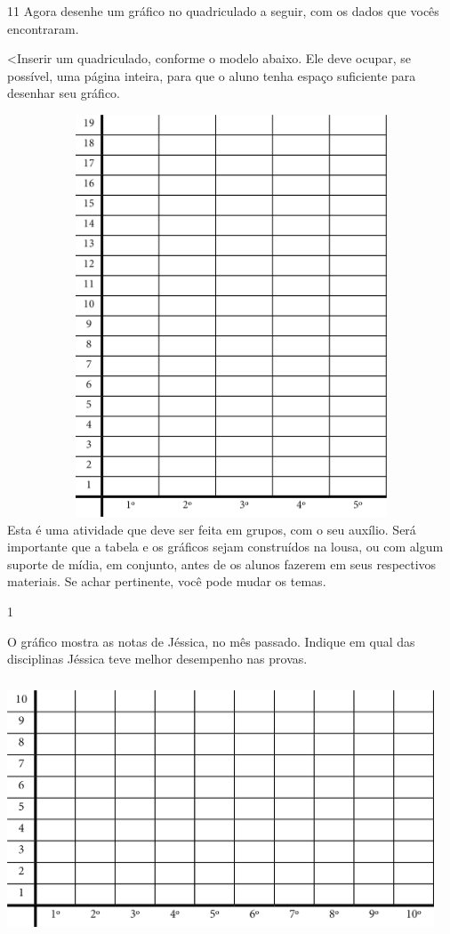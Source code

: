 {{{{{{{{{{{{{{{{{\num{11}
Agora desenhe um gráfico no quadriculado a seguir, com os dados que vocês
encontraram.

\textless{}Inserir um quadriculado, conforme o modelo abaixo. Ele deve
ocupar, se possível, uma página inteira, para que o aluno tenha espaço
suficiente para desenhar seu gráfico.

\includegraphics[width=6.27778in,height=4.70833in]{media/image96.png}
Esta é uma atividade que deve ser feita em grupos, com o
seu auxílio. Será importante que a tabela e os gráficos sejam
construídos na lousa, ou com algum suporte de mídia, em conjunto, antes
de os alunos fazerem em seus respectivos materiais. Se achar pertinente,
você pode mudar os temas. 


\num{1}

O gráfico mostra as notas de Jéssica, no mês passado. Indique em
qual das disciplinas Jéssica teve melhor desempenho nas provas.

\includegraphics[width=5.00000in,height=3.01042in]{media/image97.png}

}}}}}}}}}}}}}}}}}
